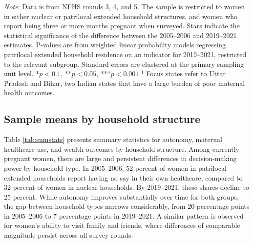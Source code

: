 \documentclass[10pt,twoside,reqno]{article}
\begin{document}
\begin{table}[H]
\sansmath
\sffamily
\captionsetup{style=CAPFIG}
\caption{Proportion of pregnant women in patrilocal extended households is increasing among all subgroups}
\label{tab:patrilocal_subgroups}
\vspace{-4pt}

\begin{scriptsize}
\setlength{\tabcolsep}{6pt}
\renewcommand{\arraystretch}{1.3}
\centering

\end{scriptsize}


\vspace{1ex}
\small\scriptsize{\textsf{\textit{Note}: Data is from NFHS rounds 3, 4, and 5.}} 
\small\scriptsize{\textsf{The sample is restricted to women in either nuclear or patrilocal extended household structures, and women who report being three or more months pregnant when surveyed.}}
\newline\small\scriptsize{Stars indicate the statistical significance of the difference between the 2005--2006 and 2019--2021 estimates. P-values are from weighted linear probability models regressing patrilocal extended household residence on an indicator for 2019--2021, restricted to the relevant subgroup. Standard errors are clustered at the primary sampling unit level. \textsf{*$p<0.1$, **$p<0.05$, ***$p<0.001$}}
\newline\small\scriptsize{\textsf{$^1$ Focus states refer to Uttar Pradesh and Bihar, two Indian states that have a large burden of poor maternal health outcomes.}}

\end{table}

\subsection{Sample means by household structure}

Table \ref{tab:sumstats} presents summary statistics for autonomy, maternal healthcare use, and wealth outcomes by household structure. Among currently pregnant women, there are large and persistent differences in decision-making power by household type. In 2005–2006, 52 percent of women in patrilocal extended households report having no say in their own healthcare, compared to 32 percent of women in nuclear households. By 2019–2021, these shares decline to 25 percent. While autonomy improves substantially over time for both groups, the gap between household types narrows considerably, from 20 percentage points in 2005–2006 to 7 percentage points in 2019–2021. A similar pattern is observed for women’s ability to visit family and friends, where differences of comparable magnitude persist across all survey rounds.
\end{document}
